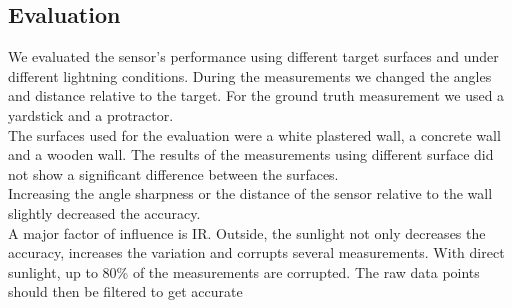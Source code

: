 \subsection{Evaluation}
We evaluated the sensor's performance using different target surfaces and under different lightning conditions. During the measurements we changed the angles and distance relative to the target. For the ground truth measurement we used a yardstick and a protractor. \\
The surfaces used for the evaluation were a white plastered wall, a concrete wall and a wooden wall. The results of the measurements using different surface did not show a significant difference between the surfaces. \\ 
Increasing the angle sharpness or the distance of the sensor relative to the wall slightly decreased the accuracy. \\
A major factor of influence is IR. Outside, the sunlight not only decreases the accuracy, increases the variation and corrupts several measurements. With direct sunlight, up to 80\% of the measurements are corrupted. The raw data points should then be filtered to get accurate 







